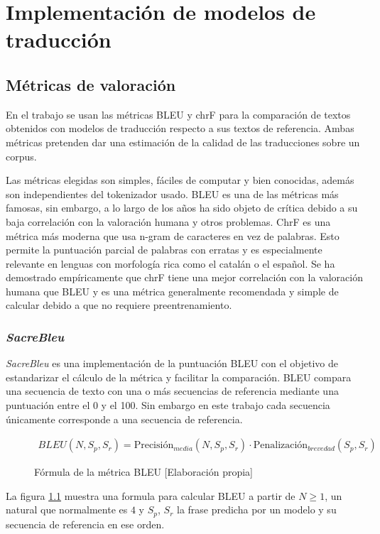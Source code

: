 \chapter{Implementación de modelos de traducción}

\section{Métricas de valoración}
En el trabajo se usan las métricas BLEU y chrF para la comparación de textos obtenidos con modelos de traducción respecto a sus textos de referencia. Ambas métricas pretenden dar una estimación de la calidad de las traducciones sobre un corpus.

Las métricas elegidas son simples, fáciles de computar y bien conocidas, además son independientes del tokenizador usado.
BLEU es una de las métricas más famosas, sin embargo, a lo largo de los años ha sido objeto de crítica debido a su baja correlación con la valoración humana y otros problemas. ChrF es una métrica más moderna que usa n-gram de caracteres en vez de palabras. Esto permite la puntuación parcial de palabras con erratas y es especialmente relevante en lenguas con morfología rica como el catalán o el español. Se ha demostrado empíricamente que chrF tiene una mejor correlación con la valoración humana que BLEU \cite{Ma2019Aug} y es una métrica generalmente recomendada \cite{Kocmi2021Jul} y simple de calcular debido a que no requiere preentrenamiento.

\subsection{\textit{SacreBleu}}
\textit{SacreBleu} \cite{Post2018Oct} es una implementación de la puntuación BLEU con el objetivo de estandarizar el cálculo de la métrica y facilitar la comparación.
BLEU compara una secuencia de texto con una o más secuencias de referencia mediante una puntuación entre el 0 y el 100. Sin embargo en este trabajo cada secuencia únicamente corresponde a una secuencia de referencia.

\begin{figure}[H]
    \begin{align*}
        BLEU(N,S_{p},S_{r}) = \text{Precisión}_{media}(N, S_{p}, S_{r})\cdot \text{Penalización}_{brevedad}(S_{p}, S_{r})
    \end{align*}
    \caption{Fórmula de la métrica BLEU [Elaboración propia]}\label{Bleuform}
\end{figure}
La figura \ref{Bleuform} muestra una formula para calcular BLEU a partir de $N \geq 1$, un natural que normalmente es $4$ y $S_{p}$, $S_{r}$ la frase predicha por un modelo y su secuencia de referencia en ese orden.

